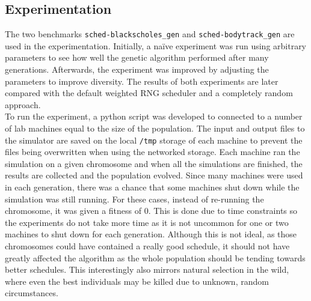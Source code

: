 \documentclass{article}
\newcommand{\n}[0]{\\[\baselineskip]}
\begin{document}
\subsection{Experimentation}
The two benchmarks \texttt{sched-blackscholes_gen} and \texttt{sched-bodytrack_gen} are used in the experimentation. Initially, a na\"{i}ve experiment was run using arbitrary parameters to see how well the genetic algorithm performed after many generations. Afterwards, the experiment was improved by adjusting the parameters to improve diversity. The results of both experiments are later compared with the default weighted RNG scheduler and a completely random approach. 
\n
To run the experiment, a python script was developed to connected to a number of lab machines equal to the size of the population. The input and output files to the simulator are saved on the local \texttt{/tmp} storage of each machine to prevent the files being overwritten when using the networked storage. Each machine ran the simulation on a given chromosome and when all the simulations are finished, the results are collected and the population evolved. Since many machines were used in each generation, there was a chance that some machines shut down while the simulation was still running. For these cases, instead of re-running the chromosome, it was given a fitness of 0. This is done due to time constraints so the experiments do not take more time as it is not uncommon for one or two machines to shut down for each generation. Although this is not ideal, as those chromosomes could have contained a really good schedule, it should not have greatly affected the algorithm as the whole population should be tending towards better schedules. This interestingly also mirrors natural selection in the wild, where even the best individuals may be killed due to unknown, random circumstances.
\end{document}
